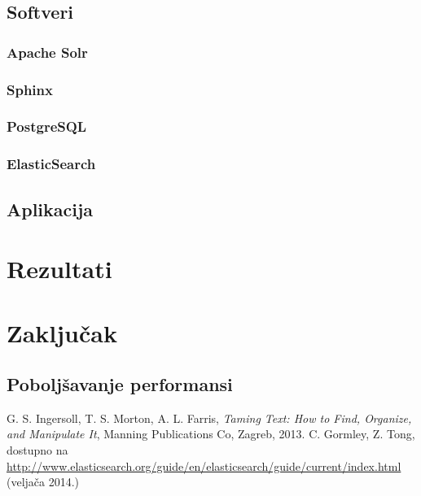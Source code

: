 \documentclass[a4paper,twoside,12pt]{memoir}
\begin{document}
\section{Softveri}

\subsection{Apache Solr}

\subsection{Sphinx}

\subsection{PostgreSQL}

\subsection{ElasticSearch}

\section{Aplikacija}

\chapter{Rezultati}

\chapter{Zaključak}


\section{Poboljšavanje performansi}


\begin{thebibliography}{99}
   G. S. Ingersoll, T. S. Morton, A. L. Farris, \textit{Taming Text: How to Find, Organize, and Manipulate It}, Manning Publications Co, Zagreb, 2013.
   C. Gormley, Z. Tong, dostupno na \url{http://www.elasticsearch.org/guide/en/elasticsearch/guide/current/index.html} (veljača 2014.)
\end{thebibliography}

\pagestyle{empty}

\begin{sazetak}
\end{sazetak}

\begin{summary}
\end{summary}

\begin{cv}
\end{cv}
\end{document}
